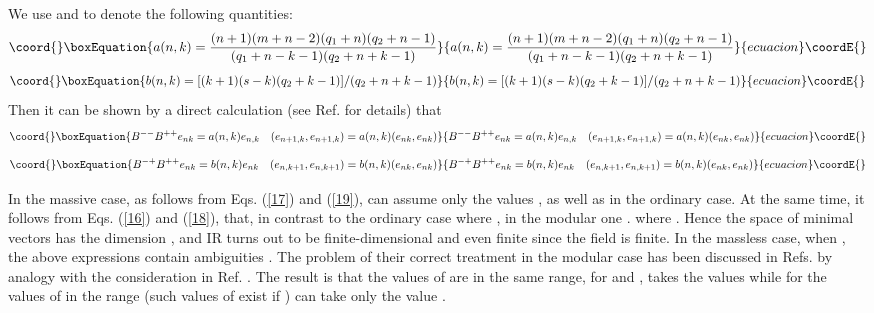 \documentclass[a4paper,12pt]{article}%
\begin{document}
We use \coordHE{} and \coordHE{} to denote the following quantities: 
\begin{equation}\coord{}\boxEquation{
a(n,k)=\frac{(n+1)(m+n-2)(q_1+n)(q_2+n-1)}{(q_1+n-k-1)(q_2+n+k-1)}
\label{16}
}{
a(n,k)=\frac{(n+1)(m+n-2)(q_1+n)(q_2+n-1)}{(q_1+n-k-1)(q_2+n+k-1)}
}{ecuacion}\coordE{}\end{equation}
\begin{equation}\coord{}\boxEquation{
b(n,k)=[(k+1)(s-k)(q_2+k-1)]/(q_2+n+k-1)
\label{17}
}{
b(n,k)=[(k+1)(s-k)(q_2+k-1)]/(q_2+n+k-1)
}{ecuacion}\coordE{}\end{equation}
Then it can be shown by a direct calculation (see Ref. 
\cite{lev2} for details) that
\begin{equation}\coord{}\boxEquation{
B^{--}B^{++}e_{nk}=a(n,k)e_{n,k}\quad 
(e_{n+1,k},e_{n+1,k})=a(n,k)(e_{nk},e_{nk})
\label{18}
}{
B^{--}B^{++}e_{nk}=a(n,k)e_{n,k}\quad 
(e_{n+1,k},e_{n+1,k})=a(n,k)(e_{nk},e_{nk})
}{ecuacion}\coordE{}\end{equation}
\begin{equation}\coord{}\boxEquation{
B^{-+}B^{++}e_{nk}=b(n,k)e_{nk}\quad (e_{n,k+1},e_{n,k+1})=
b(n,k)(e_{nk},e_{nk})
\label{19}
}{
B^{-+}B^{++}e_{nk}=b(n,k)e_{nk}\quad (e_{n,k+1},e_{n,k+1})=
b(n,k)(e_{nk},e_{nk})
}{ecuacion}\coordE{}\end{equation}

In the massive case, as follows from Eqs. (\ref{17}) and
(\ref{19}), \coordHE{} can assume only the values \coordHE{}, as well
as in the ordinary case. At the same time, it follows from Eqs.
(\ref{16}) and (\ref{18}), that, in contrast to the ordinary 
case where \coordHE{}, in the modular one \coordHE{}. 
where \coordHE{}. Hence the space of minimal vectors has the 
dimension \coordHE{},
and IR turns out to be finite-dimensional and even finite since
the field \coordHE{} is finite. In the massless case, when \coordHE{},
the above expressions contain ambiguities \coordHE{}. The problem of
their correct treatment in the modular case has been discussed in Refs.
\cite{lev2,lev3} by analogy with the consideration in Ref. \cite{Evans}.
The result is that the values of \coordHE{} are in the same range, for \coordHE{}
and \coordHE{}, \coordHE{} takes the values \coordHE{} while for the values
of \coordHE{} in the range \coordHE{} (such values of \coordHE{} exist if 
\coordHE{}) \coordHE{} can take only the value \coordHE{}.
\end{document}
